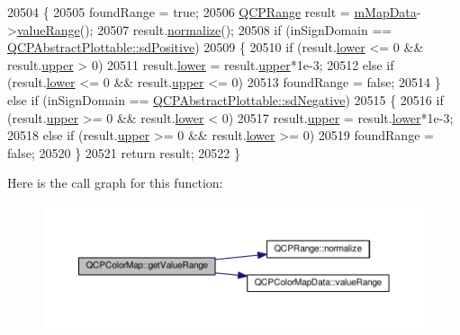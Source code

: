 \begin{DoxyCode}
20504 \{
20505   foundRange = \textcolor{keyword}{true};
20506   \hyperlink{class_q_c_p_range}{QCPRange} result = \hyperlink{class_q_c_p_color_map_a8709272aa8f0be3ca111bf3866806f8b}{mMapData}->\hyperlink{class_q_c_p_color_map_data_a025be4d7ba0494fd7b38a5a56c737f2a}{valueRange}();
20507   result.\hyperlink{class_q_c_p_range_af914a7740269b0604d0827c634a878a9}{normalize}();
20508   \textcolor{keywordflow}{if} (inSignDomain == \hyperlink{class_q_c_p_abstract_plottable_a661743478a1d3c09d28ec2711d7653d8a02951859f243a4d24e779cfbb5471030}{QCPAbstractPlottable::sdPositive})
20509   \{
20510     \textcolor{keywordflow}{if} (result.\hyperlink{class_q_c_p_range_aa3aca3edb14f7ca0c85d912647b91745}{lower} <= 0 && result.\hyperlink{class_q_c_p_range_ae44eb3aafe1d0e2ed34b499b6d2e074f}{upper} > 0)
20511       result.\hyperlink{class_q_c_p_range_aa3aca3edb14f7ca0c85d912647b91745}{lower} = result.\hyperlink{class_q_c_p_range_ae44eb3aafe1d0e2ed34b499b6d2e074f}{upper}*1e-3;
20512     \textcolor{keywordflow}{else} \textcolor{keywordflow}{if} (result.\hyperlink{class_q_c_p_range_aa3aca3edb14f7ca0c85d912647b91745}{lower} <= 0 && result.\hyperlink{class_q_c_p_range_ae44eb3aafe1d0e2ed34b499b6d2e074f}{upper} <= 0)
20513       foundRange = \textcolor{keyword}{false};
20514   \} \textcolor{keywordflow}{else} \textcolor{keywordflow}{if} (inSignDomain == \hyperlink{class_q_c_p_abstract_plottable_a661743478a1d3c09d28ec2711d7653d8a0fc9a70796ef60ad18ddd18056e6dc63}{QCPAbstractPlottable::sdNegative})
20515   \{
20516     \textcolor{keywordflow}{if} (result.\hyperlink{class_q_c_p_range_ae44eb3aafe1d0e2ed34b499b6d2e074f}{upper} >= 0 && result.\hyperlink{class_q_c_p_range_aa3aca3edb14f7ca0c85d912647b91745}{lower} < 0)
20517       result.\hyperlink{class_q_c_p_range_ae44eb3aafe1d0e2ed34b499b6d2e074f}{upper} = result.\hyperlink{class_q_c_p_range_aa3aca3edb14f7ca0c85d912647b91745}{lower}*1e-3;
20518     \textcolor{keywordflow}{else} \textcolor{keywordflow}{if} (result.\hyperlink{class_q_c_p_range_ae44eb3aafe1d0e2ed34b499b6d2e074f}{upper} >= 0 && result.\hyperlink{class_q_c_p_range_aa3aca3edb14f7ca0c85d912647b91745}{lower} >= 0)
20519       foundRange = \textcolor{keyword}{false};
20520   \}
20521   \textcolor{keywordflow}{return} result;
20522 \}
\end{DoxyCode}


Here is the call graph for this function\+:\nopagebreak
\begin{figure}[H]
\begin{center}
\leavevmode
\includegraphics[width=350pt]{class_q_c_p_color_map_ac1b906e05ca9b61680e61b74b3825a22_cgraph}
\end{center}
\end{figure}


